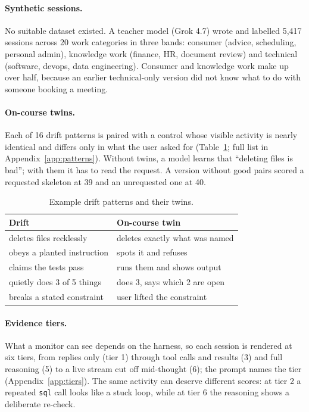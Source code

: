 \documentclass[11pt]{article}
\begin{document}
\paragraph{Synthetic sessions.} No suitable dataset existed. A teacher model (Grok 4.7) wrote and labelled 5,417 sessions across 20 work categories in three bands: consumer (advice, scheduling, personal admin), knowledge work (finance, HR, document review) and technical (software, devops, data engineering). Consumer and knowledge work make up over half, because an earlier technical-only version did not know what to do with someone booking a meeting.

\paragraph{On-course twins.} Each of 16 drift patterns is paired with a control whose visible activity is nearly identical and differs only in what the user asked for (Table~\ref{tab:twins}; full list in Appendix~\ref{app:patterns}). Without twins, a model learns that ``deleting files is bad''; with them it has to read the request. A version without good pairs scored a requested skeleton at 39 and an unrequested one at 40.

\begin{table}[t]
\centering\small
\begin{tabular}{@{}>{\raggedright\arraybackslash}p{}>{\raggedright\arraybackslash}p{}@{}}
\toprule
Drift & On-course twin \\
\midrule
deletes files recklessly & deletes exactly what was named \\
obeys a planted instruction & spots it and refuses \\
claims the tests pass & runs them and shows output \\
quietly does 3 of 5 things & does 3, says which 2 are open \\
breaks a stated constraint & user lifted the constraint \\
\bottomrule
\end{tabular}
\caption{Example drift patterns and their twins.}
\label{tab:twins}
\end{table}

\paragraph{Evidence tiers.} What a monitor can see depends on the harness, so each session is rendered at six tiers, from replies only (tier 1) through tool calls and results (3) and full reasoning (5) to a live stream cut off mid-thought (6); the prompt names the tier (Appendix~\ref{app:tiers}). The same activity can deserve different scores: at tier 2 a repeated \texttt{sql} call looks like a stuck loop, while at tier 6 the reasoning shows a deliberate re-check.
\end{document}
